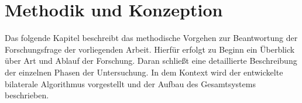 
\chapter{Methodik und Konzeption}
\label{ch:methodik}
Das folgende Kapitel beschreibt das methodische Vorgehen zur Beantwortung der Forschungsfrage der vorliegenden Arbeit.
Hierfür erfolgt zu Beginn ein Überblick über Art und Ablauf der Forschung.
Daran schließt eine detaillierte Beschreibung der einzelnen Phasen der Untersuchung.
In dem Kontext wird der entwickelte bilaterale Algorithmus vorgestellt und der Aufbau des Gesamtsystems beschrieben.



